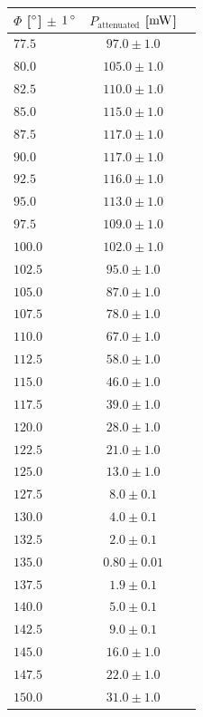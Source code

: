 \documentclass{protokoll_en}
\begin{document}
\begin{appendix}
\begin{table}[H]
\begin{floatrow}
{\begin{tabular}{lcc}
    \toprule
      $\Phi$ [$\unit[]{^\circ}$] $\pm$ $\unit[1]{^\circ}$ & $P_\textrm{attenuated}$ [$\unit[]{mW}$]\\
    \midrule[0.75pt]
$77.5$ & $97.0 \pm 1.0$ \\
$80.0$ & $105.0 \pm 1.0$ \\
$82.5$ & $110.0 \pm 1.0$ \\
$85.0$ & $115.0 \pm 1.0$ \\
$87.5$ & $117.0 \pm 1.0$ \\
$90.0$ & $117.0 \pm 1.0$ \\
$92.5$ & $116.0 \pm 1.0$ \\
$95.0$ & $113.0 \pm 1.0$ \\
$97.5$ & $109.0 \pm 1.0$ \\
$100.0$ & $102.0 \pm 1.0$ \\
$102.5$ & $95.0 \pm 1.0$ \\
$105.0$ & $87.0 \pm 1.0$ \\
$107.5$ & $78.0 \pm 1.0$ \\
$110.0$ & $67.0 \pm 1.0$ \\
$112.5$ & $58.0 \pm 1.0$ \\
$115.0$ & $46.0 \pm 1.0$ \\
$117.5$ & $39.0 \pm 1.0$ \\
$120.0$ & $28.0 \pm 1.0$ \\
$122.5$ & $21.0 \pm 1.0$ \\
$125.0$ & $13.0 \pm 1.0$ \\
$127.5$ & $8.0 \pm 0.1$ \\
$130.0$ & $4.0 \pm 0.1$ \\
$132.5$ & $2.0 \pm 0.1$ \\
$135.0$ & $0.80 \pm 0.01$ \\
$137.5$ & $1.9 \pm 0.1$ \\
$140.0$ & $5.0 \pm 0.1$ \\
$142.5$ & $9.0 \pm 0.1$ \\
$145.0$ & $16.0 \pm 1.0$ \\
$147.5$ & $22.0 \pm 1.0$ \\
$150.0$ & $31.0 \pm 1.0$ \\
    \bottomrule
  \end{tabular}
}
\end{floatrow}
\end{table}
\end{appendix}
\end{document}
